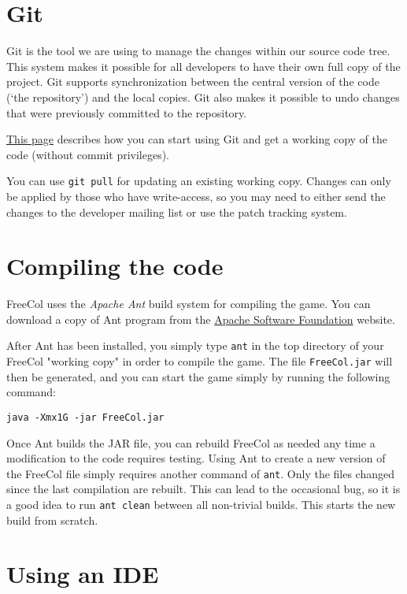 \documentclass[12pt]{book}
\begin{document}
\hypertarget{Git}{\section{Git}}

Git is the tool we are using to manage the changes within our source
code tree. This system makes it possible for all developers to have
their own full copy of the project. Git supports synchronization
between the central version of the code (`the repository') and the
local copies. Git also makes it possible to undo changes that were
previously committed to the repository.

\href{http://www.freecol.org/documentation/git.html}{This page}
describes how you can start using Git and get a working copy of the
code (without commit privileges).

You can use \verb+git pull+ for updating an existing working
copy. Changes can only be applied by those who have write-access, so
you may need to either send the changes to the developer mailing list
or use the patch tracking system.


\hypertarget{Compiling the code}{\section{Compiling the code}}

FreeCol uses the \textit{Apache Ant} build system for compiling the
game. You can download a copy of Ant program from the
\href{http://ant.apache.org}{Apache Software Foundation} website.

After Ant has been installed, you simply type \verb+ant+ in the top
directory of your FreeCol "working copy" in order to compile the game.
The file \verb+FreeCol.jar+ will then be generated, and you can start
the game simply by running the following command:

\verb+java -Xmx1G -jar FreeCol.jar+

Once Ant builds the JAR file, you can rebuild FreeCol as needed any time
a modification to the code requires testing. Using Ant to create
a new version of the FreeCol file simply requires another command of
\verb+ant+. Only the files changed since the last compilation are rebuilt.
This can lead to the occasional bug, so it is a good idea to run \verb+ant clean+
between all non-trivial builds. This starts the new build from scratch.

\hypertarget{Using an IDE}{\section{Using an IDE}}
\end{document}
